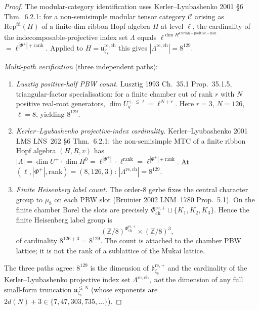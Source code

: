 \begin{proof}
The modular-category identification uses Kerler--Lyubashenko 2001
\S6 Thm.~6.2.1: for a non-semisimple modular tensor category
$\mathcal C$ arising as $\mathrm{Rep}^{\mathrm{fd}}(H)$ of a finite-dim
ribbon Hopf algebra $H$ at level $\ell$, the cardinality of the
indecomposable-projective index set $\Lambda$ equals
$\ell^{\dim H^{\mathrm{Cartan-positive-half}}}$
$=\ell^{|\Phi^+|+\mathrm{rank}}$. Applied to
$H=\mathfrak u_{\zeta_8}^{\mathrm{re,ch}}$ this gives
$|\Lambda^{\mathrm{re,ch}}|=8^{129}$.

\emph{Multi-path verification} (three independent paths):
\begin{enumerate}[label=(P\arabic*)]
 \item \emph{Lusztig positive-half PBW count.} Lusztig 1993 Ch.~35.1
 Prop.~35.1.5, triangular-factor specialisation: for a
 finite chamber cut of rank \(r\) with \(N\) positive real-root
 generators, \(\dim U^{+,\le\ell}_q=\ell^{N+r}\). Here \(r=3\),
 \(N=126\), \(\ell=8\), yielding \(8^{129}\).
 \item \emph{Kerler--Lyubashenko projective-index cardinality.}
 Kerler--Lyubashenko 2001 LMS LNS~262 \S6 Thm.~6.2.1: the
 non-semisimple MTC of a finite ribbon Hopf algebra
 $(H,R,v)$ has $|\Lambda|=\dim U^+\cdot\dim H^0
 =\ell^{|\Phi^+|}\cdot\ell^{\mathrm{rank}}=\ell^{|\Phi^+|+
 \mathrm{rank}}$. At $(\ell,|\Phi^+|,\mathrm{rank})=(8,126,3)$:
 $|\Lambda^{\mathrm{re,ch}}|=8^{129}$.
 \item \emph{Finite Heisenberg label count.} The order-$8$ gerbe fixes
 the central character group to \(\mu_8\) on each PBW slot
 (Bruinier 2002 LNM~1780 Prop.~5.1). On the finite chamber Borel the
 slots are precisely
 \(\Phi^{\mathrm{re},+}_{\mathrm{ch}}\sqcup\{K_1,K_2,K_3\}\). Hence the
 finite Heisenberg label group is
 \[
  (\mathbb Z/8)^{\Phi^{\mathrm{re},+}_{\mathrm{ch}}}
  \times(\mathbb Z/8)^3,
 \]
 of cardinality \(8^{126+3}=8^{129}\). The count is attached to the
 chamber PBW lattice; it is not the rank of a sublattice of the Mukai
 lattice.
\end{enumerate}
The three paths agree: $8^{129}$ is the dimension of
$\mathfrak b^{\mathrm{re},+}_{\zeta_8}$ and the cardinality of the
Kerler--Lyubashenko projective index set $\Lambda^{\mathrm{re,ch}}$,
\emph{not} the dimension of any full small-form truncation
$\mathfrak u_{\zeta_8}^{\le N}$ (whose exponents are
$2d(N)+3\in\{7,47,303,735,\ldots\}$).
\end{proof}

